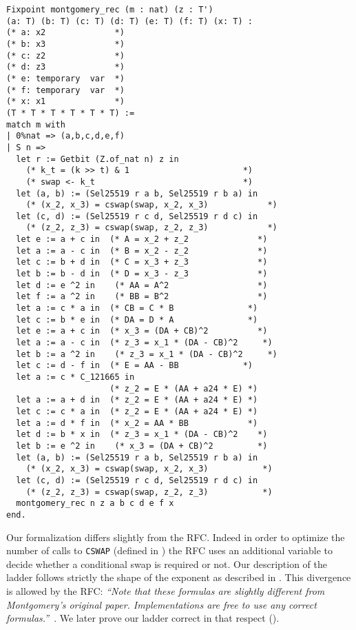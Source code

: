 \begin{lstlisting}[language=Coq]
Fixpoint montgomery_rec (m : nat) (z : T')
(a: T) (b: T) (c: T) (d: T) (e: T) (f: T) (x: T) :
(* a: x2              *)
(* b: x3              *)
(* c: z2              *)
(* d: z3              *)
(* e: temporary  var  *)
(* f: temporary  var  *)
(* x: x1              *)
(T * T * T * T * T * T) :=
match m with
| 0%nat => (a,b,c,d,e,f)
| S n =>
  let r := Getbit (Z.of_nat n) z in
    (* k_t = (k >> t) & 1                       *)
    (* swap <- k_t                              *)
  let (a, b) := (Sel25519 r a b, Sel25519 r b a) in
    (* (x_2, x_3) = cswap(swap, x_2, x_3)            *)
  let (c, d) := (Sel25519 r c d, Sel25519 r d c) in
    (* (z_2, z_3) = cswap(swap, z_2, z_3)            *)
  let e := a + c in  (* A = x_2 + z_2              *)
  let a := a - c in  (* B = x_2 - z_2              *)
  let c := b + d in  (* C = x_3 + z_3              *)
  let b := b - d in  (* D = x_3 - z_3              *)
  let d := e ^2 in    (* AA = A^2                  *)
  let f := a ^2 in    (* BB = B^2                  *)
  let a := c * a in  (* CB = C * B               *)
  let c := b * e in  (* DA = D * A               *)
  let e := a + c in  (* x_3 = (DA + CB)^2          *)
  let a := a - c in  (* z_3 = x_1 * (DA - CB)^2     *)
  let b := a ^2 in    (* z_3 = x_1 * (DA - CB)^2     *)
  let c := d - f in  (* E = AA - BB             *)
  let a := c * C_121665 in
                     (* z_2 = E * (AA + a24 * E) *)
  let a := a + d in  (* z_2 = E * (AA + a24 * E) *)
  let c := c * a in  (* z_2 = E * (AA + a24 * E) *)
  let a := d * f in  (* x_2 = AA * BB            *)
  let d := b * x in  (* z_3 = x_1 * (DA - CB)^2    *)
  let b := e ^2 in    (* x_3 = (DA + CB)^2         *)
  let (a, b) := (Sel25519 r a b, Sel25519 r b a) in
    (* (x_2, x_3) = cswap(swap, x_2, x_3)           *)
  let (c, d) := (Sel25519 r c d, Sel25519 r d c) in
    (* (z_2, z_3) = cswap(swap, z_2, z_3)           *)
  montgomery_rec n z a b c d e f x
end.
\end{lstlisting}


Our formalization differs slightly from the RFC. Indeed in order to optimize the
number of calls to \texttt{CSWAP} (defined in )
the RFC uses an additional variable to decide
whether a conditional swap is required or not. Our description of the ladder
follows strictly the shape of the exponent as described in .
This divergence is allowed by the RFC:
\emph{``Note that these formulas are slightly different from Montgomery's
original paper. Implementations are free to use any correct formulas.''}~\cite{rfc7748}.
We later prove our ladder correct in that respect ().

